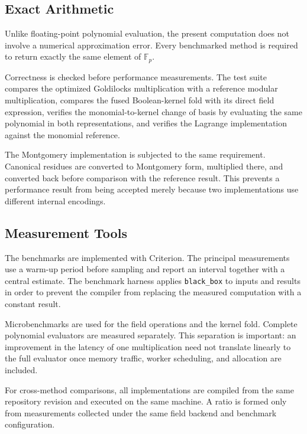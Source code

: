 \subsection{Exact Arithmetic}
\label{sec:exact-arithmetic}

Unlike floating-point polynomial evaluation, the present computation does
not involve a numerical approximation error.  Every benchmarked method is
required to return exactly the same element of \(\mathbb{F}_p\).

Correctness is checked before performance measurements.  The test suite
compares the optimized Goldilocks multiplication with a reference modular
multiplication, compares the fused Boolean-kernel fold with its direct field
expression, verifies the monomial-to-kernel change of basis by evaluating
the same polynomial in both representations, and verifies the Lagrange
implementation against the monomial reference.

The Montgomery implementation is subjected to the same requirement.
Canonical residues are converted to Montgomery form, multiplied there, and
converted back before comparison with the reference result.  This prevents
a performance result from being accepted merely because two implementations
use different internal encodings.

\subsection{Measurement Tools}
\label{sec:measurement-tools}

The benchmarks are implemented with Criterion.  The principal measurements
use a warm-up period before sampling and report an interval together with a
central estimate.  The benchmark harness applies \texttt{black\_box} to
inputs and results in order to prevent the compiler from replacing the
measured computation with a constant result.

Microbenchmarks are used for the field operations and the kernel fold.
Complete polynomial evaluators are measured separately.  This separation is
important: an improvement in the latency of one multiplication need not
translate linearly to the full evaluator once memory traffic, worker
scheduling, and allocation are included.

For cross-method comparisons, all implementations are compiled from the same
repository revision and executed on the same machine.  A ratio is formed
only from measurements collected under the same field backend and benchmark
configuration.

